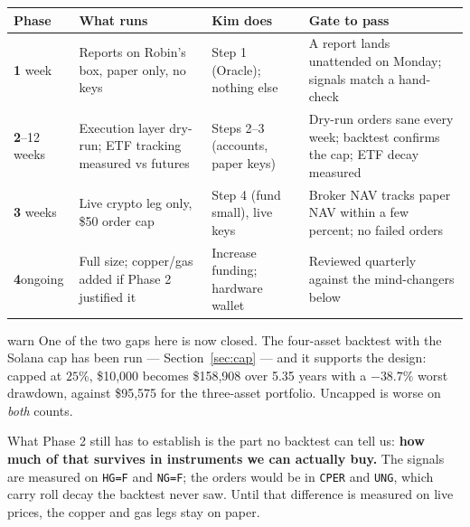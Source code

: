 \documentclass[11pt,a4paper]{article}
\begin{document}
\vspace{0.5em}
\begin{tabular}{@{}p{1.5cm}p{3.1cm}p{4.0cm}p{4.6cm}@{}}
    \toprule
    \textbf{Phase} & \textbf{What runs} & \textbf{Kim does} & \textbf{Gate to pass} \\
    \midrule
    \textbf{1}\newline 1 week &
    Reports on Robin's box, paper only, no keys &
    Step 1 (Oracle); nothing else &
    A report lands unattended on Monday; signals match a hand-check \\[0.4em]
    \textbf{2}\newline 4--12 weeks &
    Execution layer dry-run; ETF tracking measured vs futures &
    Steps 2--3 (accounts, paper keys) &
    Dry-run orders sane every week; backtest confirms the cap; ETF decay measured \\[0.4em]
    \textbf{3}\newline 4 weeks &
    Live crypto leg only, \$50 order cap &
    Step 4 (fund small), live keys &
    Broker NAV tracks paper NAV within a few percent; no failed orders \\[0.4em]
    \textbf{4}\newline ongoing &
    Full size; copper/gas added if Phase 2 justified it &
    Increase funding; hardware wallet &
    Reviewed quarterly against the mind-changers below \\
    \bottomrule
\end{tabular}

\vspace{0.8em}
\begin{resultbox}{warn}
One of the two gaps here is now closed. The four-asset backtest with the
Solana cap has been run --- Section~\ref{sec:cap} --- and it supports the
design: capped at $25\%$, \$10{,}000 becomes \$158{,}908 over 5.35 years
with a $-38.7\%$ worst drawdown, against \$95{,}575 for the three-asset
portfolio. Uncapped is worse on \emph{both} counts.

\vspace{0.5em}
What Phase 2 still has to establish is the part no backtest can tell us:
\textbf{how much of that survives in instruments we can actually buy.}
The signals are measured on \texttt{HG=F} and \texttt{NG=F}; the orders
would be in \texttt{CPER} and \texttt{UNG}, which carry roll decay the
backtest never saw. Until that difference is measured on live prices,
the copper and gas legs stay on paper.
\end{resultbox}
\end{document}
